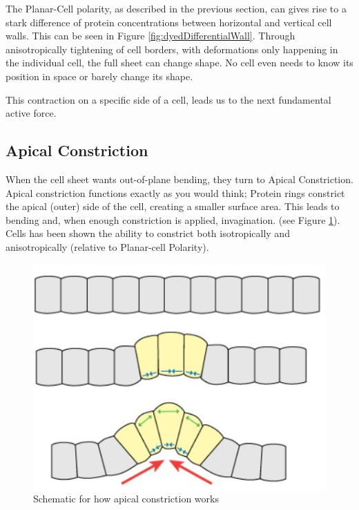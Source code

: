 The Planar-Cell polarity, as described in the previous section, can gives rise to a stark difference of protein concentrations between horizontal and vertical cell walls. This can be seen in Figure \ref{fig:dyedDifferentialWall}.
Through anisotropically tightening of cell borders, with deformations only happening in the individual cell, the full sheet can change shape. No cell even needs to know its position in space or barely change its shape. 

This contraction on a specific side of a cell, leads us to the next fundamental active force.



\subsection{ Apical Constriction }
\label{sec:ApicalConstriction}
When the cell sheet wants out-of-plane bending, they turn to Apical Constriction. Apical constriction functions exactly as you would think; Protein rings constrict the apical (outer) side of the cell, creating a smaller surface area. This leads to bending and, when enough constriction is applied, invagination. (see Figure \ref{fig:apical-constriction}). Cells has been shown the ability to constrict both isotropically and anisotropically (relative to Planar-cell Polarity).

\begin{figure}[H]
    \centering
    \includegraphics[width=0.3\linewidth]{chapters/Theory/figures/apical_constriction_schematic.png}
    \caption{Schematic for how apical constriction works}
    \label{fig:apical-constriction}
\end{figure}



